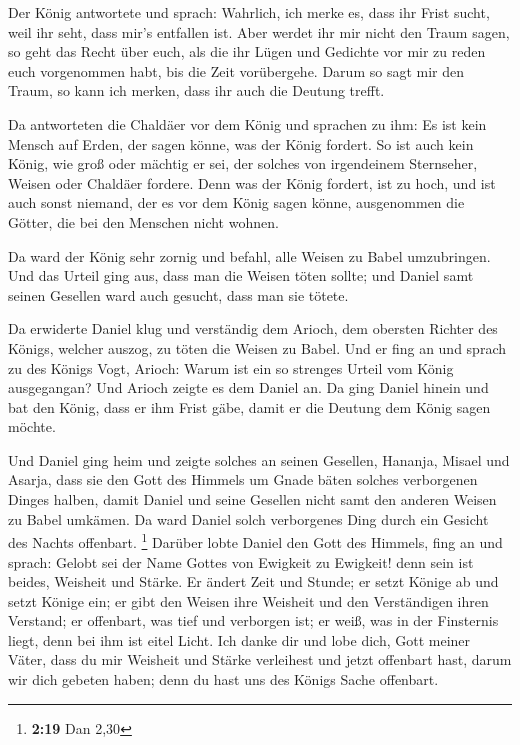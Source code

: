  Der König antwortete und sprach: Wahrlich, ich merke es,
dass ihr Frist sucht, weil ihr seht, dass mir's entfallen ist.
 Aber werdet ihr mir nicht den Traum sagen, so geht das
Recht über euch, als die ihr Lügen und Gedichte vor mir zu reden euch
vorgenommen habt, bis die Zeit vorübergehe. Darum so sagt mir den Traum,
so kann ich merken, dass ihr auch die Deutung trefft.

 Da antworteten die Chaldäer vor dem König und sprachen
zu ihm: Es ist kein Mensch auf Erden, der sagen könne, was der König
fordert. So ist auch kein König, wie groß oder mächtig er sei, der
solches von irgendeinem Sternseher, Weisen oder Chaldäer fordere.
 Denn was der König fordert, ist zu hoch, und ist auch
sonst niemand, der es vor dem König sagen könne, ausgenommen die Götter,
die bei den Menschen nicht wohnen.

 Da ward der König sehr zornig und befahl, alle Weisen zu
Babel umzubringen.  Und das Urteil ging aus, dass man die
Weisen töten sollte; und Daniel samt seinen Gesellen ward auch gesucht,
dass man sie tötete.

 Da erwiderte Daniel klug und verständig dem Arioch, dem
obersten Richter des Königs, welcher auszog, zu töten die Weisen zu
Babel.  Und er fing an und sprach zu des Königs Vogt,
Arioch: Warum ist ein so strenges Urteil vom König ausgegangan? Und
Arioch zeigte es dem Daniel an.  Da ging Daniel hinein
und bat den König, dass er ihm Frist gäbe, damit er die Deutung dem
König sagen möchte.

 Und Daniel ging heim und zeigte solches an seinen
Gesellen, Hananja, Misael und Asarja,  dass sie den Gott
des Himmels um Gnade bäten solches verborgenen Dinges halben, damit
Daniel und seine Gesellen nicht samt den anderen Weisen zu Babel
umkämen.  Da ward Daniel solch verborgenes Ding durch ein
Gesicht des Nachts offenbart. \footnote{\textbf{2:19} Dan 2,30}
 Darüber lobte Daniel den Gott des Himmels, fing an und
sprach: Gelobt sei der Name Gottes von Ewigkeit zu Ewigkeit! denn sein
ist beides, Weisheit und Stärke.  Er ändert Zeit und
Stunde; er setzt Könige ab und setzt Könige ein; er gibt den Weisen ihre
Weisheit und den Verständigen ihren Verstand;  er
offenbart, was tief und verborgen ist; er weiß, was in der Finsternis
liegt, denn bei ihm ist eitel Licht.  Ich danke dir und
lobe dich, Gott meiner Väter, dass du mir Weisheit und Stärke verleihest
und jetzt offenbart hast, darum wir dich gebeten haben; denn du hast uns
des Königs Sache offenbart.

